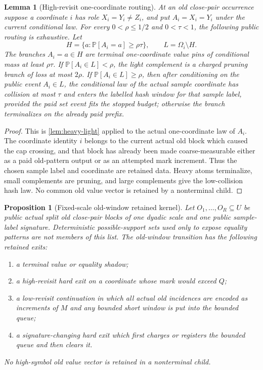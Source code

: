 \documentclass[11pt]{article}
\newcommand{\Cref}[1]{\ref{#1}}
\newtheorem{lemma}[theorem]{Lemma}
\newtheorem{proposition}[theorem]{Proposition}
\theoremstyle{remark}
\newcommand{\Prob}{\mathbb P}
\begin{document}
\begin{lemma}[High-revisit one-coordinate routing]\label{lem:high-revisit}
At an old close-pair occurrence suppose a coordinate $i$ has role $X_i=Y_i\ne Z_i$, and put $A_i=X_i=Y_i$ under the current conditional law.  For every $0<\rho\le1/2$ and $0<\tau<1$, the following public routing is exhaustive.  Let
\[
        H=\{a:\Prob[A_i=a]\ge\rho\tau\},\qquad L=\Omega_i\setminus H.
\]
The branches $A_i=a\in H$ are terminal one-coordinate value pins of conditional mass at least $\rho\tau$.  If $\Prob[A_i\in L]<\rho$, the light complement is a charged pruning branch of loss at most $2\rho$.  If $\Prob[A_i\in L]\ge\rho$, then after conditioning on the public event $A_i\in L$, the conditional law of the actual sample coordinate has collision at most $\tau$ and enters the labelled hash window for that sample label, provided the paid set event fits the stopped budget; otherwise the branch terminalizes on the already paid prefix.
\end{lemma}

\begin{proof}
This is \Cref{lem:heavy-light} applied to the actual one-coordinate law of $A_i$.  The coordinate identity $i$ belongs to the current actual old block which caused the cap crossing, and that block has already been made coarse-measurable either as a paid old-pattern output or as an attempted mark increment.  Thus the chosen sample label and coordinate are retained data.  Heavy atoms terminalize, small complements are pruning, and large complements give the low-collision hash law.  No common old value vector is retained by a nonterminal child.
\end{proof}

\begin{proposition}[Fixed-scale old-window retained kernel]\label{prop:old-window}
Let $O_1,\ldots,O_R\subseteq U$ be public actual split old close-pair blocks of one dyadic scale and one public sample-label signature.  Deterministic possible-support sets used only to expose equality patterns are not members of this list.  The old-window transition has the following retained exits:
\begin{enumerate}[label=\textup{(\roman*)}]
\item a terminal value or equality shadow;
\item a high-revisit hard exit on a coordinate whose mark would exceed $Q$;
\item a low-revisit continuation in which all actual old incidences are encoded as increments of $M$ and any bounded short window is put into the bounded queue;
\item a signature-changing hard exit which first charges or registers the bounded queue and then clears it.
\end{enumerate}
No high-symbol old value vector is retained in a nonterminal child.
\end{proposition}
\end{document}
